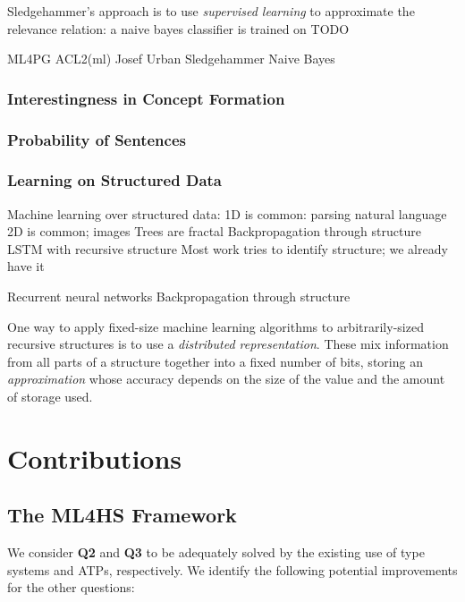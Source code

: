 \documentclass[]{article}
\begin{document}
Sledgehammer's approach is to use \emph{supervised learning} to approximate the relevance relation: a naive bayes classifier is trained on TODO

ML4PG
ACL2(ml)
Josef Urban
Sledgehammer
Naive Bayes

\subsubsection{Interestingness in Concept Formation}
\label{conceptformation}




\subsubsection{Probability of Sentences}

\subsubsection{Learning on Structured Data}

Machine learning over structured data:
1D is common: parsing natural language
2D is common; images
Trees are fractal
Backpropagation through structure
LSTM with recursive structure
Most work tries to identify structure; we already have it

Recurrent neural networks
Backpropagation through structure

One way to apply fixed-size machine learning algorithms to arbitrarily-sized recursive structures is to use a \emph{distributed representation}. These mix information from all parts of a structure together into a fixed number of bits, storing an \emph{approximation} whose accuracy depends on the size of the value and the amount of storage used.

\section{Contributions}
\label{current}

\subsection{The \textsc{ML4HS} Framework}\label{ml4hs}

We consider \textbf{Q2} and \textbf{Q3} to be adequately solved by the existing
use of type systems and ATPs, respectively. We identify the following potential
improvements for the other questions:
\end{document}
